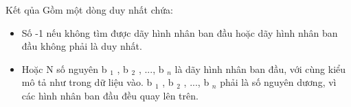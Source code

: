 Kết qủa
Gồm một dòng duy nhất chứa:  
\begin{itemize}
	\item     Số -1 nếu không tìm được dãy hình nhân ban đầu hoặc dãy hình nhân ban đầu không phải là duy nhất.   
	\item     Hoặc N số nguyên b    $_     1    $    , b    $_     2    $    , ..., b    $_     n    $    là dãy hình nhân ban đầu, với cùng kiểu mô tả như trong dữ liệu vào. b    $_     1    $    , b    $_     2    $    , ..., b    $_     n    $    phải là số nguyên dương, vì các hình nhân ban đầu đều quay lên trên.   
\end{itemize}